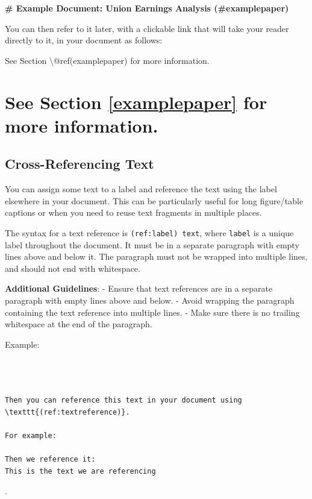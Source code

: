 \documentclass[
]{book}
\newenvironment{Shaded}{\begin{snugshade}}{\end{snugshade}}
\newcommand{\FunctionTok}[1]{\textcolor[rgb]{0.13,0.29,0.53}{\textbf{#1}}}
\newcommand{\NormalTok}[1]{#1}
\theoremstyle{definition}
\theoremstyle{definition}
\theoremstyle{definition}
\theoremstyle{definition}
\theoremstyle{remark}
\begin{document}
\begin{Shaded}
\begin{Highlighting}[]
\FunctionTok{\# Example Document: Union Earnings Analysis (\#examplepaper)}
\end{Highlighting}
\end{Shaded}

You can then refer to it later, with a clickable link that will take your reader directly to it, in your document as follows:

\begin{Shaded}
\begin{Highlighting}[]
\NormalTok{See Section \textbackslash{}@ref(examplepaper) for more information.}
\end{Highlighting}
\end{Shaded}

\section{See Section \ref{examplepaper} for more information.}\label{see-section-refexamplepaper-for-more-information.}

\subsection{Cross-Referencing Text}\label{cross-referencing-text}

You can assign some text to a label and reference the text using the label elsewhere in your document. This can be particularly useful for long figure/table captions or when you need to reuse text fragments in multiple places.

The syntax for a text reference is \texttt{(ref:label)\ text}, where \texttt{label} is a unique label throughout the document. It must be in a separate paragraph with empty lines above and below it. The paragraph must not be wrapped into multiple lines, and should not end with whitespace.

\textbf{Additional Guidelines}:
- Ensure that text references are in a separate paragraph with empty lines above and below.
- Avoid wrapping the paragraph containing the text reference into multiple lines.
- Make sure there is no trailing whitespace at the end of the paragraph.

Example:

\begin{verbatim}



Then you can reference this text in your document using \texttt{(ref:textreference)}.

For example:

Then we reference it:
This is the text we are referencing
\end{verbatim}.
\end{document}
